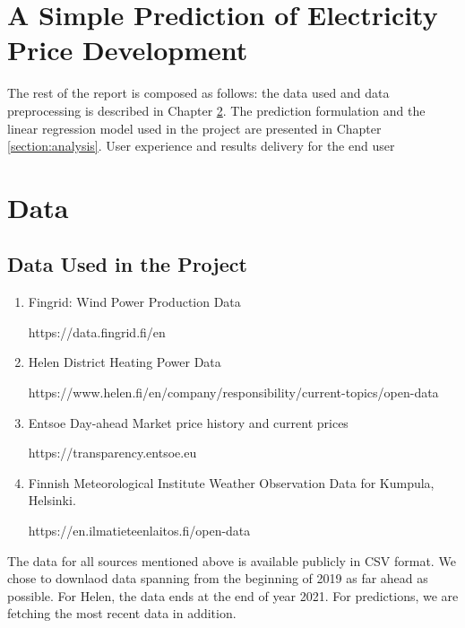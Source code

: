 \documentclass{article}
\begin{document}


\tableofcontents

\section{A Simple Prediction of Electricity Price Development}
\label{section:introduction}


The rest of the report is composed as follows: the data used and data preprocessing is described in Chapter \ref{section:data}. The prediction formulation and the linear regression model used in the project are presented in Chapter \ref{section:analysis}. User experience and results delivery for the end user 

\section{Data}
\label{section:data}

\subsection{Data Used in the Project}
\label{subsection:datadescription}

\begin{enumerate}
    \item Fingrid: Wind Power Production Data
    
    https://data.fingrid.fi/en
    
    \item Helen District Heating Power Data
    
    https://www.helen.fi/en/company/responsibility/current-topics/open-data
    
    \item Entsoe Day-ahead Market price history and current prices
    
    https://transparency.entsoe.eu
    
    \item Finnish Meteorological Institute Weather Observation Data for Kumpula, Helsinki.
    
    https://en.ilmatieteenlaitos.fi/open-data
    
\end{enumerate}

The data for all sources mentioned above is available publicly in CSV format. We chose to downlaod data spanning from the beginning of 2019 as far ahead as possible. For Helen, the data ends at the end of year 2021. For predictions, we are fetching the most recent data in addition.
\end{document}
